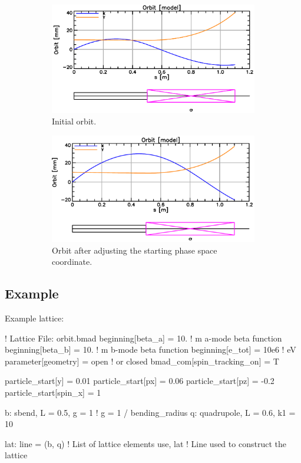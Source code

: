 \documentclass{hitec}     %
\begin{document}
\begin{figure}[tb]
  \centering
  \begin{subfigure}[t]{0.48\textwidth}
    \includegraphics[width=\textwidth]{phase0.pdf}
    \caption{Initial orbit.}
    \label{f:phase0}
  \end{subfigure}
  \hfil
  \begin{subfigure}[t]{0.48\textwidth}
    \includegraphics[width=\textwidth]{phase1.pdf}
    \caption{Orbit after adjusting the starting  phase space coordinate.}
    \label{f:phase1}
  \end{subfigure}
  \caption{}
\end{figure}

\subsection{Example}

Example lattice:
\begin{code}
! Lattice File: orbit.bmad
beginning[beta_a] = 10.   ! m  a-mode beta function
beginning[beta_b] = 10.   ! m  b-mode beta function
beginning[e_tot] = 10e6   ! eV
parameter[geometry] = open  ! or closed
bmad_com[spin_tracking_on] = T

particle_start[y] = 0.01
particle_start[px] = 0.06
particle_start[pz] = -0.2
particle_start[spin_x] = 1

b: sbend, L = 0.5, g = 1    ! g = 1 / bending_radius
q: quadrupole, L = 0.6, k1 = 10

lat: line = (b, q)   ! List of lattice elements
use, lat                ! Line used to construct the lattice
\end{code}
\end{document}
